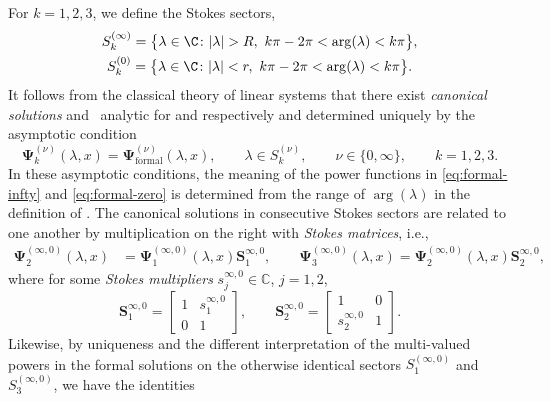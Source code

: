 For $k = 1, 2,3$, we define the Stokes sectors,
\begin{gather*}
S_k^{(\infty)} = \bigl\{ \lambda \in \C \colon |\lambda| > R, \ k\pi - 2\pi < \arg (\lambda) < k\pi \bigr \},\\
S_k^{(0)} = \bigl \{ \lambda \in \C \colon |\lambda| < r, \ k\pi - 2\pi < \arg (\lambda) < k\pi \bigr\}.
\end{gather*}
 It follows from the classical theory of linear systems that there exist \emph{canonical solutions}  and~ analytic for  and  respectively and determined uniquely by the asymptotic condition
\begin{equation}
\mathbf{\Psi}_k^{(\nu)}(\lambda, x) = \mathbf{\Psi}^{(\nu)}_{\text{formal}}(\lambda, x), \qquad \lambda \in S_k^{(\nu)}, \qquad \nu \in \{0, \infty\}, \qquad k=1,2,3.
\label{eq:psi-asymptotic-condition}
\end{equation}
In these asymptotic conditions, the meaning of the power functions in \eqref{eq:formal-infty} and \eqref{eq:formal-zero} is determined from the range of $\arg(\lambda)$ in the definition of .
The canonical solutions in consecutive Stokes sectors are related to one another by multiplication on the right with \emph{Stokes matrices}, i.e.,
\begin{align}%
\label{eq:stokes-condition-1}\mathbf{\Psi}_2^{(\infty, 0)}(\lambda, x) &= \mathbf{\Psi}_1^{(\infty, 0)}(\lambda, x) \mathbf{S}^{\infty, 0}_{1}, \qquad
\mathbf{\Psi}_3^{(\infty, 0)}(\lambda, x) = \mathbf{\Psi}_2^{(\infty, 0)}( \lambda, x) \mathbf{S}^{\infty, 0}_{2},
\end{align}
where for some \emph{Stokes multipliers} $s_j^{\infty,0}\in\mathbb{C}$, $j=1,2$,
\begin{equation}
\mathbf{S}^{\infty, 0}_{1}= \begin{bmatrix}1&s^{\infty, 0}_1\\0&1\end{bmatrix},\qquad \mathbf{S}^{\infty, 0}_{{2}}=
\begin{bmatrix}1&0\\{s^{\infty, 0}_2}&1\end{bmatrix}.
 \label{eq:Stokes-infty}
\end{equation}
Likewise, by uniqueness and the different interpretation of the multi-valued powers in the formal solutions on the otherwise identical sectors $S^{(\infty,0)}_1$ and $S^{(\infty,0)}_3$, we have the identities
